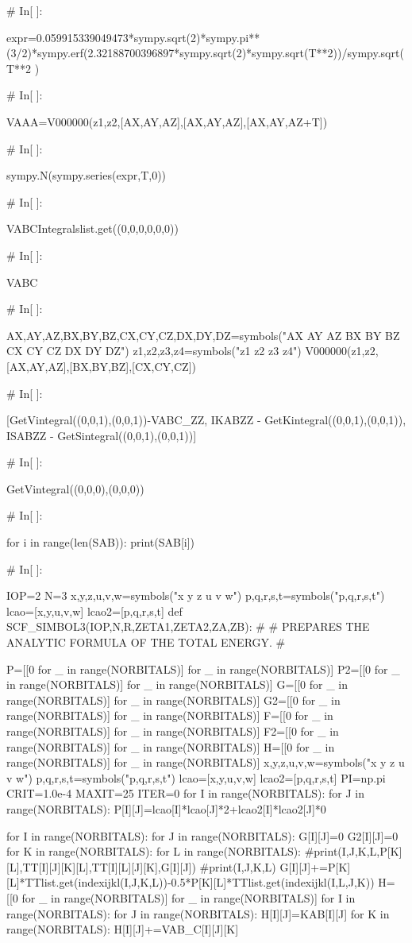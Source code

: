 # In[ ]:


expr=0.059915339049473*sympy.sqrt(2)*sympy.pi**(3/2)*sympy.erf(2.32188700396897*sympy.sqrt(2)*sympy.sqrt(T**2))/sympy.sqrt(T**2 )


# In[ ]:


VAAA=V000000(z1,z2,[AX,AY,AZ],[AX,AY,AZ],[AX,AY,AZ+T])


# In[ ]:


sympy.N(sympy.series(expr,T,0))


# In[ ]:


VABCIntegralslist.get((0,0,0,0,0,0))


# In[ ]:


VABC


# In[ ]:


AX,AY,AZ,BX,BY,BZ,CX,CY,CZ,DX,DY,DZ=symbols("AX AY AZ BX BY BZ CX CY CZ DX DY DZ")
z1,z2,z3,z4=symbols("z1 z2 z3 z4")
V000000(z1,z2,[AX,AY,AZ],[BX,BY,BZ],[CX,CY,CZ])


# In[ ]:


[GetVintegral((0,0,1),(0,0,1))-VABC_ZZ,
IKABZZ - GetKintegral((0,0,1),(0,0,1)),
ISABZZ - GetSintegral((0,0,1),(0,0,1))]


# In[ ]:


GetVintegral((0,0,0),(0,0,0))


# In[ ]:


for i in range(len(SAB)):
    print(SAB[i])


# In[ ]:


IOP=2
N=3
x,y,z,u,v,w=symbols("x y z u v w")
p,q,r,s,t=symbols("p,q,r,s,t")
lcao=[x,y,u,v,w]
lcao2=[p,q,r,s,t]
def SCF_SIMBOL3(IOP,N,R,ZETA1,ZETA2,ZA,ZB):
#
# PREPARES THE ANALYTIC FORMULA OF THE TOTAL ENERGY.
#


    P=[[0 for _ in range(NORBITALS)] for _ in range(NORBITALS)]
    P2=[[0 for _ in range(NORBITALS)] for _ in range(NORBITALS)]
    G=[[0 for _ in range(NORBITALS)] for _ in range(NORBITALS)]
    G2=[[0 for _ in range(NORBITALS)] for _ in range(NORBITALS)]
    F=[[0 for _ in range(NORBITALS)] for _ in range(NORBITALS)]
    F2=[[0 for _ in range(NORBITALS)] for _ in range(NORBITALS)]
    H=[[0 for _ in range(NORBITALS)] for _ in range(NORBITALS)]
    x,y,z,u,v,w=symbols("x y z u v w")
    p,q,r,s,t=symbols("p,q,r,s,t")
    lcao=[x,y,u,v,w]
    lcao2=[p,q,r,s,t]
    PI=np.pi
    CRIT=1.0e-4
    MAXIT=25
    ITER=0
    for I in range(NORBITALS):
        for J in range(NORBITALS):
            P[I][J]=lcao[I]*lcao[J]*2+lcao2[I]*lcao2[J]*0

    for I in range(NORBITALS):
        for J in range(NORBITALS):
            G[I][J]=0
            G2[I][J]=0
            for K in range(NORBITALS):
                for L in range(NORBITALS):
                    #print(I,J,K,L,P[K][L],TT[I][J][K][L],TT[I][L][J][K],G[I][J])
                    #print(I,J,K,L)
                    G[I][J]+=P[K][L]*TTlist.get(indexijkl(I,J,K,L))-0.5*P[K][L]*TTlist.get(indexijkl(I,L,J,K))
    H=[[0 for _ in range(NORBITALS)] for _ in range(NORBITALS)]
    for I in range(NORBITALS):
        for J in range(NORBITALS):
            H[I][J]=KAB[I][J]
            for K in range(NORBITALS):
                H[I][J]+=VAB_C[I][J][K]


